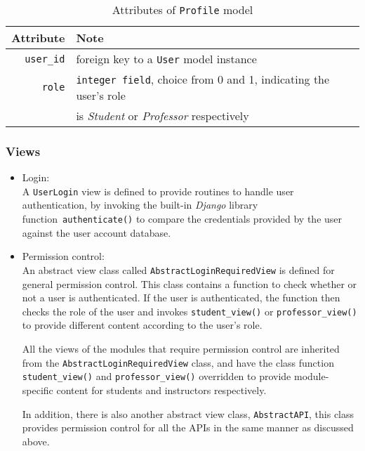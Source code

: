 \begin{table}[ht]
    \centering
    \caption{Attributes of \texttt{Profile} model}
    \label{tab:PROFILE_ATTR}
    \renewcommand{\arraystretch}{1.3}
    \begin{tabular}[ht]{r|p{4.5in}}
        \hline
        Attribute & Note \\
        \hline
        \hline
        \texttt{user\_id} & foreign key to a \texttt{User} model instance \\
        \hline
        \texttt{role} & \texttt{integer field}, choice from 0 and 1, indicating the
            user's role \\
           & is \emph{Student} or \emph{Professor} respectively \\
        \hline
    \end{tabular}
    \renewcommand{\arraystretch}{1}
\end{table}


\subsubsection{Views}

\begin{itemize}
    \item Login: \\
        A \texttt{UserLogin} view is defined to provide routines to handle user
        authentication, by invoking the built-in \emph{Django} library
        function~\texttt{authenticate()}
        to compare the credentials provided
        by the user against the user account database.

    \item Permission control: \\
        An abstract view class called \texttt{AbstractLoginRequiredView} is
        defined for general permission control. This class contains a function
        to check whether or not a user is authenticated. If the user is
        authenticated, the function then checks the role of the user and
        invokes \texttt{student\_view()} or \texttt{professor\_view()} to
        provide different content according to the user's role.

        All the views of the modules that require permission control are
        inherited from the \texttt{AbstractLoginRequiredView} class, and have
        the class function \texttt{student\_\-view()} and
        \texttt{professor\_view()} overridden to provide module-specific
        content for students and instructors respectively.

        In addition, there is also another abstract view class,
        \texttt{AbstractAPI}, this class provides permission
        control for all the APIs in the same manner as discussed above.
\end{itemize}

